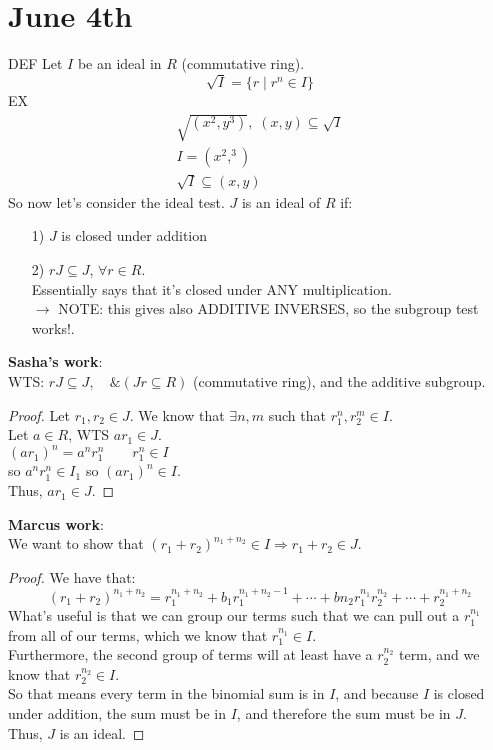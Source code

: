 \documentclass[10pt,oneisde]{book}
\newcommand{\vp}{\vspace{0.15cm}\\}
\newcommand{\vpp}{\vspace{0.25cm}\\}
\begin{document}
\section*{June 4th}
DEF Let $I$ be an ideal in $R$ (commutative ring).
$$\sqrt I = \{r\mid r^n\in I\}$$
\color{red}
EX 
\begin{align*}
    \sqrt{(x^2,y^3)}, \; (x,y)\subseteq \sqrt I\\
    I = (x^2,^3)\\
    \sqrt I \subseteq (x,y)
\end{align*}
\color{blue}
So now let's consider the ideal test. 
$J$ is an ideal of $R$ if:
\begin{enumerate}
    \item [1)]$J$ is closed under addition
    \item [2)]$rJ\subseteq J$, $\forall r \in R$. \\
        Essentially says that it's closed under ANY multiplication.\\
        \color{darkgreen}$\rightarrow $ NOTE: this gives also ADDITIVE INVERSES, so the subgroup test works!.
\end{enumerate}
\color{sasha}
\textbf{Sasha's work}:\vpp
WTS: $rJ\subseteq J,\quad \&(Jr\subseteq R)$ (commutative ring), and the additive subgroup.
\begin{proof}
    Let $r_1,r_2\in J$. We know that $\exists n,m$ such that $r_1^n, r_2^m \in I$. \vp
    Let $a\in R$, WTS $ar_1\in J$.\vp
    $(ar_1)^n=a^nr_1^n\quad\quad r_1^n\in I$\vp
    so $a^nr_1^n \in I_1$ so $(ar_1)^n\in I$.\vp
    Thus, $ar_1\in J$.
\end{proof}
\color{marcus}
\textbf{Marcus work}:\vpp
We want to show that $(r_1+r_2)^{n_1+n_2}\in I\Rightarrow r_1+r_2\in J$.
\begin{proof}
    We have that: 
    $$(r_1+r_2)^{n_1+n_2}=r_1^{n_1+n_2}+b_1r_1^{n_1+n_2-1}+\cdots+b{n_2}r_1^{n_1}r_2^{n_2}+\cdots+r_2^{n_1+n_2}$$
    What's useful is that we can group our terms such that we can pull out a $r_1^{n_1}$ from all of our terms, which we know that $r_1^{n_1}\in I$. \vp
    Furthermore, the second group of terms will at least have a $r_2^{n_2}$ term, and we know that $r_2^{n_2}\in I$. \vp
    So that means every term in the binomial sum is in $I$, and because $I$ is closed under addition, the sum must be in $I$, and therefore the sum must be in $J$. \vp
    Thus, $J$ is an ideal. 
\end{proof}
\color{black}
\newpage
\end{document}

